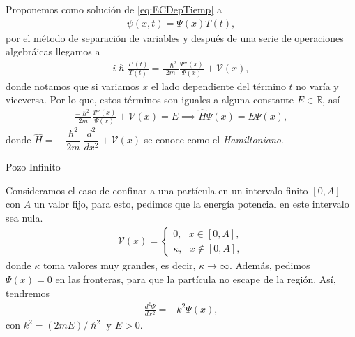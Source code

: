\documentclass[aspectratio=1610]{beamer}
\newcommand*{\field}[1]{\mathbb{#1}}
\begin{document}
\bgroup
\begin{frame}{}
Proponemos como solución de \eqref{eq:ECDepTiemp} a
\begin{align*}
    \psi(x,t) = \Psi(x)T(t),
\end{align*}
por el método de separación de variables y después de una serie de operaciones algebráicas llegamos a 
\begin{align*}
    i\hslash \frac{T'(t) }{T(t)} = \frac{-\hslash ^2 }{2m}\frac{\Psi''(x)}{\Psi(x)} + \mathcal{V}(x),
\end{align*}
donde notamos que si variamos $x$ el lado dependiente del término $t$ no varía y viceversa. Por lo que, estos términos son iguales a alguna constante $E \in \field{R}$, así
\begin{align}
\frac{-\hslash ^2 }{2m}\frac{\Psi''(x)}{\Psi(x)} + \mathcal{V}(x) = E \implies 
\hat{H} \Psi(x) = E \Psi(x),
\label{eq:HamiltonianEigenValues}
\end{align}
donde $\hat{H} = - \dfrac{\hslash^2}{2m}\dfrac{d^2}{dx^2} + \mathcal{V}(x)$ se conoce como el  \textit{Hamiltoniano}.

\end{frame}



\begin{frame}{Pozo Infinito}
   
Consideramos el caso de confinar a una partícula en un intervalo finito $[0 , A]$ con $A$ un valor fijo, para esto, pedimos que la energía potencial en este intervalo sea nula.
\begin{align*}
        \mathcal{V}(x) = 
        \left\{ \begin{array}{ll}
        0, \:\:\:  x \in [0,A],
        \\
        \kappa, \:\:\: x \notin [0,A],
        \end{array}
        \right.
\end{align*}
donde $\kappa$ toma valores muy grandes, es decir, $\kappa \to\infty$. Además, pedimos $\Psi(x) = 0$ en las fronteras, para que la partícula no escape de la región. Así, tendremos 
\begin{align}
    \frac{d^2\Psi}{dx^2} = -k^2\Psi(x),
    \label{eq:PozoInfinito}
\end{align}
con $k^2 = (2mE)/\hslash^2$ y $ E>0.$
    
\begin{columns}
\column{37em}
\end{columns}
\end{frame}
\end{document}
